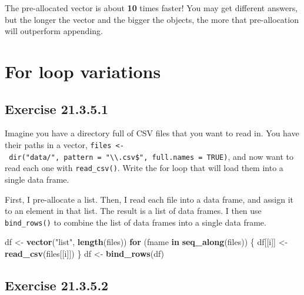 \documentclass[]{book}
\newenvironment{Shaded}{\begin{snugshade}}{\end{snugshade}}
\newcommand{\ControlFlowTok}[1]{\textcolor[rgb]{0.13,0.29,0.53}{\textbf{#1}}}
\newcommand{\KeywordTok}[1]{\textcolor[rgb]{0.13,0.29,0.53}{\textbf{#1}}}
\newcommand{\NormalTok}[1]{#1}
\newcommand{\StringTok}[1]{\textcolor[rgb]{0.31,0.60,0.02}{#1}}
\theoremstyle{plain}
\theoremstyle{remark}
\begin{document}
The pre-allocated vector is about \textbf{10} times faster!
You may get different answers, but the longer the vector and the bigger the objects, the more that pre-allocation will outperform appending.

\hypertarget{for-loop-variations}{%
\section{For loop variations}\label{for-loop-variations}}

\hypertarget{exercise-21.3.5.1}{%
\subsection*{\texorpdfstring{Exercise {21.3.5.1}}{Exercise 21.3.5.1}}\label{exercise-21.3.5.1}}

Imagine you have a directory full of CSV files that you want to read in.
You have their paths in a vector,
\texttt{files\ \textless{}-\ dir("data/",\ pattern\ =\ "\textbackslash{}\textbackslash{}.csv\$",\ full.names\ =\ TRUE)}, and now
want to read each one with \texttt{read\_csv()}. Write the for loop that will
load them into a single data frame.

First, I pre-allocate a list. Then, I read each file into a data frame, and assign it to an element in that list.
The result is a list of data frames.
I then use \texttt{bind\_rows()} to combine the list of data frames into a single data frame.

\begin{Shaded}
\begin{Highlighting}[]
\NormalTok{df <-}\StringTok{ }\KeywordTok{vector}\NormalTok{(}\StringTok{"list"}\NormalTok{, }\KeywordTok{length}\NormalTok{(files))}
\ControlFlowTok{for}\NormalTok{ (fname }\ControlFlowTok{in} \KeywordTok{seq_along}\NormalTok{(files)) \{}
\NormalTok{  df[[i]] <-}\StringTok{ }\KeywordTok{read_csv}\NormalTok{(files[[i]])}
\NormalTok{\}}
\NormalTok{df <-}\StringTok{ }\KeywordTok{bind_rows}\NormalTok{(df)}
\end{Highlighting}
\end{Shaded}

\hypertarget{exercise-21.3.5.2}{%
\subsection*{\texorpdfstring{Exercise {21.3.5.2}}{Exercise 21.3.5.2}}\label{exercise-21.3.5.2}}
\end{document}
